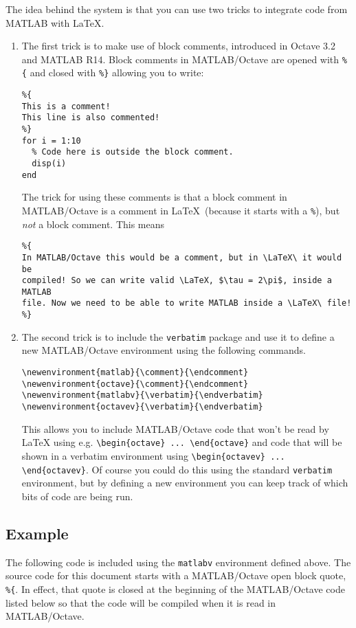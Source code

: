 \documentclass{article}
\begin{document}
The idea behind the system is that you can use two tricks to integrate
code from MATLAB with \LaTeX.
\begin{enumerate}
\item The first trick is to make use of block comments, introduced in
  Octave 3.2 and MATLAB R14. Block comments in MATLAB/Octave are
  opened with \texttt{\%\{} and closed with \texttt{\%\}} allowing you
  to write:
\begin{verbatim} 
%{
This is a comment!                         
This line is also commented!               
%}                                         
for i = 1:10                               
  % Code here is outside the block comment.
  disp(i)                                  
end                                        
\end{verbatim}
  The trick for using these comments is that a block comment in
  MATLAB/Octave is a comment in \LaTeX\ (because it starts with a
  \texttt{\%}), but \emph{not} a block comment. This means
\begin{verbatim} 
%{
In MATLAB/Octave this would be a comment, but in \LaTeX\ it would be
compiled! So we can write valid \LaTeX, $\tau = 2\pi$, inside a MATLAB
file. Now we need to be able to write MATLAB inside a \LaTeX\ file!
%}
\end{verbatim}

\item The second trick is to include the \texttt{verbatim} package and
  use it to define a new MATLAB/Octave environment using the following
  commands.
\begin{verbatim}
\newenvironment{matlab}{\comment}{\endcomment}    
\newenvironment{octave}{\comment}{\endcomment}    
\newenvironment{matlabv}{\verbatim}{\endverbatim} 
\newenvironment{octavev}{\verbatim}{\endverbatim} 
\end{verbatim}
  This allows you to include MATLAB/Octave code that won't be read by
  LaTeX using e.g. \texttt{\textbackslash begin\{octave\}
    ... \textbackslash end\{octave\}} and code that will be shown in a
  verbatim environment using \texttt{\textbackslash begin\{octavev\}
    ... \textbackslash end\{octavev\}}. Of course you could do this
  using the standard \texttt{verbatim} environment, but by defining a
  new environment you can keep track of which bits of code are being
  run.
\end{enumerate}

\subsection{Example}
The following code is included using the \texttt{matlabv} environment
defined above. The source code for this document starts with a
MATLAB/Octave open block quote, \texttt{\%\{}. In effect, that quote
is closed at the beginning of the MATLAB/Octave code listed below so
that the code will be compiled when it is read in MATLAB/Octave.
\end{document}
